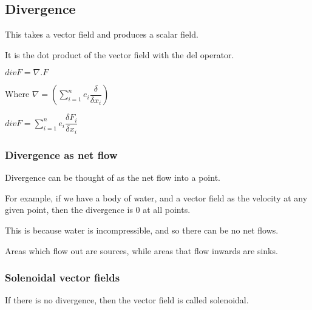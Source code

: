 
\subsection{Divergence}

This takes a vector field and produces a scalar field.

It is the dot product of the vector field with the del operator.

\(div F = \nabla . F\)

Where \(\nabla =(\sum_{i=1}^n e_i\dfrac{\delta }{\delta x_i})\)

\(div F = \sum_{i=1}^n e_i\dfrac{\delta F_i}{\delta x_i}\)

\subsubsection{Divergence as net flow}

Divergence can be thought of as the net flow into a point.

For example, if we have a body of water, and a vector field as the velocity at any given point, then the divergence is \(0\) at all points.

This is because water is incompressible, and so there can be no net flows.

Areas which flow out are sources, while areas that flow inwards are sinks.

\subsubsection{Solenoidal vector fields}

If there is no divergence, then the vector field is called solenoidal.

